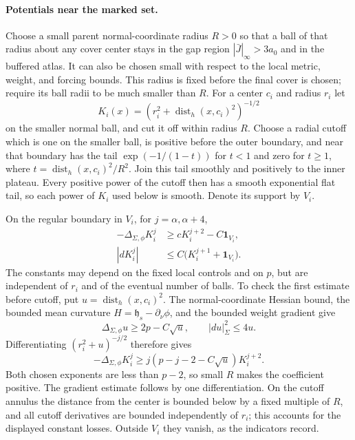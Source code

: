 \paragraph{Potentials near the marked set.}
Choose a small parent normal-coordinate radius $R>0$ so that a ball of
that radius about any cover center stays in the gap region
$|\bar J|_\infty>3a_0$ and in the buffered atlas.  It can also be chosen
small with respect to the local metric, weight, and forcing bounds.
This radius is fixed before the final cover is chosen; require its ball
radii to be much smaller than $R$.  For a center $c_i$ and radius $r_i$
let
\[
          K_i(x)=(r_i^2+\operatorname{dist}_h(x,c_i)^2)^{-1/2}
\]
on the smaller normal ball, and cut it off within radius $R$.  Choose a
radial cutoff which is one on the smaller ball, is positive before the
outer boundary, and near that boundary has the tail
$\exp(-1/(1-t))$ for $t<1$ and zero for $t\ge1$, where
$t=\operatorname{dist}_h(x,c_i)^2/R^2$.  Join this tail smoothly and
positively to the inner plateau.  Every positive power of the cutoff
then has a smooth exponential flat tail, so each power of $K_i$ used
below is smooth.  Denote its support by $V_i$.

On the regular boundary in $V_i$, for $j=\alpha,\alpha+4$,
\begin{equation}\label{eq:degree-kernel-bounds}
 \begin{split}
 -\Delta_{\Sigma,\phi}K_i^j&\ge cK_i^{j+2}-C\mathbf1_{V_i},\\
 |dK_i^j|&\le C\bigl(K_i^{j+1}+\mathbf1_{V_i}\bigr).
 \end{split}
\end{equation}
The constants may depend on the fixed local controls and on $p$, but are
independent of $r_i$ and of the eventual number of balls.  To check the
first estimate before cutoff, put $u=\operatorname{dist}_h(x,c_i)^2$.
The normal-coordinate Hessian bound, the bounded mean curvature
$H=\mathfrak h_s-\partial_\nu\phi$, and the bounded weight gradient give
\[
 \Delta_{\Sigma,\phi}u\ge2p-C\sqrt u,\qquad |du|_\Sigma^2\le4u.
\]
Differentiating $(r_i^2+u)^{-j/2}$ therefore gives
\[
 -\Delta_{\Sigma,\phi}K_i^j
 \ge j\left(p-j-2-C\sqrt u\right)K_i^{j+2}.
\]
Both chosen exponents are less than $p-2$, so small $R$ makes the
coefficient positive.  The gradient estimate follows by one
differentiation.  On the cutoff annulus the distance from the center is
bounded below by a fixed multiple of $R$, and all cutoff derivatives are
bounded independently of $r_i$; this accounts for the displayed constant
losses.  Outside $V_i$ they vanish, as the indicators record.

